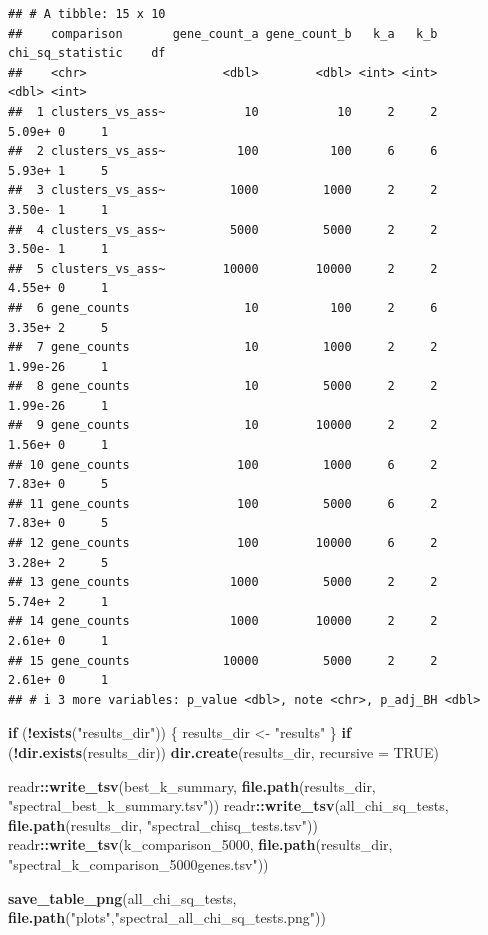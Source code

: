 \documentclass[
]{article}
\newenvironment{Shaded}{\begin{snugshade}}{\end{snugshade}}
\newcommand{\AttributeTok}[1]{\textcolor[rgb]{0.13,0.29,0.53}{#1}}
\newcommand{\ConstantTok}[1]{\textcolor[rgb]{0.56,0.35,0.01}{#1}}
\newcommand{\ControlFlowTok}[1]{\textcolor[rgb]{0.13,0.29,0.53}{\textbf{#1}}}
\newcommand{\FunctionTok}[1]{\textcolor[rgb]{0.13,0.29,0.53}{\textbf{#1}}}
\newcommand{\NormalTok}[1]{#1}
\newcommand{\OtherTok}[1]{\textcolor[rgb]{0.56,0.35,0.01}{#1}}
\newcommand{\SpecialCharTok}[1]{\textcolor[rgb]{0.81,0.36,0.00}{\textbf{#1}}}
\newcommand{\StringTok}[1]{\textcolor[rgb]{0.31,0.60,0.02}{#1}}
\begin{document}
\begin{verbatim}
## # A tibble: 15 x 10
##    comparison       gene_count_a gene_count_b   k_a   k_b chi_sq_statistic    df
##    <chr>                   <dbl>        <dbl> <int> <int>            <dbl> <int>
##  1 clusters_vs_ass~           10           10     2     2         5.09e+ 0     1
##  2 clusters_vs_ass~          100          100     6     6         5.93e+ 1     5
##  3 clusters_vs_ass~         1000         1000     2     2         3.50e- 1     1
##  4 clusters_vs_ass~         5000         5000     2     2         3.50e- 1     1
##  5 clusters_vs_ass~        10000        10000     2     2         4.55e+ 0     1
##  6 gene_counts                10          100     2     6         3.35e+ 2     5
##  7 gene_counts                10         1000     2     2         1.99e-26     1
##  8 gene_counts                10         5000     2     2         1.99e-26     1
##  9 gene_counts                10        10000     2     2         1.56e+ 0     1
## 10 gene_counts               100         1000     6     2         7.83e+ 0     5
## 11 gene_counts               100         5000     6     2         7.83e+ 0     5
## 12 gene_counts               100        10000     6     2         3.28e+ 2     5
## 13 gene_counts              1000         5000     2     2         5.74e+ 2     1
## 14 gene_counts              1000        10000     2     2         2.61e+ 0     1
## 15 gene_counts             10000         5000     2     2         2.61e+ 0     1
## # i 3 more variables: p_value <dbl>, note <chr>, p_adj_BH <dbl>
\end{verbatim}

\begin{Shaded}
\begin{Highlighting}[]
\ControlFlowTok{if}\NormalTok{ (}\SpecialCharTok{!}\FunctionTok{exists}\NormalTok{(}\StringTok{"results\_dir"}\NormalTok{)) \{}
\NormalTok{  results\_dir }\OtherTok{\textless{}{-}} \StringTok{"results"}
\NormalTok{\}}
\ControlFlowTok{if}\NormalTok{ (}\SpecialCharTok{!}\FunctionTok{dir.exists}\NormalTok{(results\_dir)) }\FunctionTok{dir.create}\NormalTok{(results\_dir, }\AttributeTok{recursive =} \ConstantTok{TRUE}\NormalTok{)}

\NormalTok{readr}\SpecialCharTok{::}\FunctionTok{write\_tsv}\NormalTok{(best\_k\_summary, }\FunctionTok{file.path}\NormalTok{(results\_dir, }\StringTok{"spectral\_best\_k\_summary.tsv"}\NormalTok{))}
\NormalTok{readr}\SpecialCharTok{::}\FunctionTok{write\_tsv}\NormalTok{(all\_chi\_sq\_tests, }\FunctionTok{file.path}\NormalTok{(results\_dir, }\StringTok{"spectral\_chisq\_tests.tsv"}\NormalTok{))}
\NormalTok{readr}\SpecialCharTok{::}\FunctionTok{write\_tsv}\NormalTok{(k\_comparison\_5000, }\FunctionTok{file.path}\NormalTok{(results\_dir, }\StringTok{"spectral\_k\_comparison\_5000genes.tsv"}\NormalTok{))}

\FunctionTok{save\_table\_png}\NormalTok{(all\_chi\_sq\_tests, }\FunctionTok{file.path}\NormalTok{(}\StringTok{"plots"}\NormalTok{,}\StringTok{"spectral\_all\_chi\_sq\_tests.png"}\NormalTok{))}
\end{Highlighting}
\end{Shaded}
\end{document}
